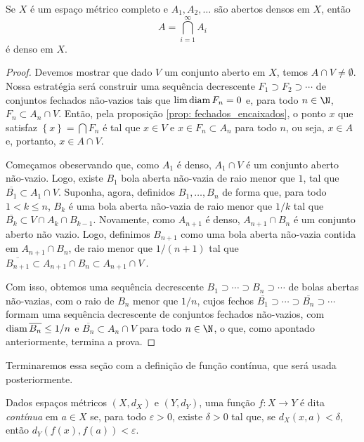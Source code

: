 \begin{teo}
    Se \( X \) é um espaço métrico completo e \( A_{ 1 }, A_{ 2 }, \dots \) são abertos densos em \( X \), então \[
        A = \bigcap_{ i=1 }^{ \infty } A_{ i }
    \]
    é denso em \( X \).
\end{teo}

\begin{proof}
    Devemos mostrar que dado \( V \) um conjunto aberto em \( X \), temos \( A \cap V \neq \emptyset \).
    Nossa estratégia será construir uma sequência decrescente \( F_{ 1 } \supset F_{ 2 } \supset \cdots \) de conjuntos fechados não-vazios tais que \( \lim \operatorname{diam} F_{ n } = 0 \) e, para todo \( n \in \N \), \( F_{ n } \subset A_{ n } \cap V \).
    Então, pela proposição \ref{prop: fechados_encaixados}, o ponto \( x \) que satisfaz \( \left\{ x \right\} = \bigcap F_{ n } \) é tal que \( x \in V \) e \( x \in F_{ n } \subset A_{ n } \) para todo \( n \), ou seja, \( x \in A \) e, portanto, \( x \in A \cap V \).

    Começamos obeservando que, como \( A_{ 1 } \) é denso, \( A_{ 1 } \cap V \) é um conjunto aberto não-vazio.
    Logo, existe \( B_{ 1 } \) bola aberta não-vazia de raio menor que \( 1 \), tal que \( \overline{B_{ 1 }} \subset A_{ 1 } \cap V \).
    Suponha, agora, definidos \( B_{ 1 }, \dots, B_{ n } \) de forma que, para todo \( 1 < k \leq n \), \( B_{ k } \) é uma bola aberta não-vazia de raio menor que \( 1/k \) tal que \( \overline{B_{ k }} \subset V \cap A_{ k } \cap B_{ k-1 } \).
    Novamente, como \( A_{ n+1 } \) é denso, \( A_{ n+1 } \cap B_{ n } \) é um conjunto aberto não vazio.
    Logo, definimos \( B_{ n+1 } \) como uma bola aberta não-vazia contida em \( A_{ n+1 } \cap B_{ n } \), de raio menor que \( 1/( n+1 ) \) tal que \( \overline{B_{ n+1 }} \subset A_{ n+1 } \cap B_{ n } \subset A_{ n+1 } \cap V \ \).

    Com isso, obtemos uma sequência decrescente \( B_{ 1 } \supset \cdots \supset B_{ n } \supset \cdots \) de bolas abertas não-vazias, com o raio de \( B_{ n } \) menor que \( 1/n \), cujos fechos \( \overline{B_{ 1 }} \supset \cdots \supset \overline{B_{ n }} \supset \cdots \) formam uma sequência decrescente de conjuntos fechados não-vazios, com \( \operatorname{diam} \overline{B_{ n }} \leq 1/n \) e \( \overline{B_{ n }} \subset A_{ n } \cap V \) para todo \( n \in \N \), o que, como apontado anteriormente, termina a prova.
\end{proof}

Terminaremos essa seção com a definição de função contínua, que será usada posteriormente.

\begin{defn}
    Dados espaços métricos \( (X, d_{ X }) \) e \( (Y, d_{ Y }) \), uma função \( f : X \to Y \) é dita \emph{contínua} em \( a \in X \) se, para todo \( \varepsilon > 0 \), existe \( \delta > 0 \) tal que, se \( d_{ X }(x, a) < \delta \), então \( d_{ Y }(f(x), f(a)) < \varepsilon \).
\end{defn}
